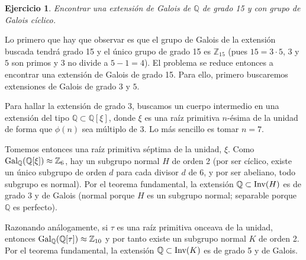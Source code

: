 \documentclass[11pt]{report}
\makeatletter
\renewenvironment{proof}[1][\proofname]{\par
  \pushQED{\qed}%
  \normalfont \topsep\z@skip %
  \trivlist
  \item[\hskip\labelsep
        \itshape
    #1\@addpunct{.}]\ignorespaces
}{%
  \popQED\endtrivlist\@endpefalse
}
\newcommand{\Z}{\mathbb Z}
\newcommand{\Q}{\mathbb Q}
\newtheorem{ejercicio}{Ejercicio}
\makeatother
\begin{document}
\begin{ejercicio}
Encontrar una extensión de Galois de $\Q$ de grado 15 y con grupo de Galois cíclico. 
\end{ejercicio}

\begin{proof}
Lo primero que hay que observar es que el grupo de Galois de la extensión buscada tendrá grado 15 y el único grupo de grado 15 es $\Z_{15}$ (pues $15 = 3 \cdot 5$, $3$ y $5$ son primos y $3$ no divide a $5-1=4$). El problema se reduce entonces a encontrar una extensión de Galois de grado 15. Para ello, primero buscaremos extensiones de Galois de grado $3$ y $5$.

Para hallar la extensión de grado $3$, buscamos un cuerpo intermedio en una extensión del tipo $\Q \subset \Q[\xi]$, donde $\xi$ es una raíz primitiva $n$-ésima de la unidad de forma que $\phi(n)$ sea múltiplo de $3$. Lo más sencillo es tomar $n = 7$. 

Tomemos entonces una raíz primitiva séptima de la unidad, $\xi$. Como $\textup{Gal}_\Q(\Q[\xi]) \approx \Z_6$, hay un subgrupo normal $H$ de orden 2 (por ser cíclico, existe un único subgrupo de orden $d$ para cada divisor $d$ de 6, y por ser abeliano, todo subgrupo es normal). Por el teorema fundamental, la extensión $\Q \subset \textup{Inv}(H)$ es de grado 3 y de Galois (normal porque $H$ es un subgrupo normal; separable porque $\Q$ es perfecto).

Razonando análogamente, si $\tau$ es una raíz primitiva onceava de la unidad, entonces $\textup{Gal}_\Q(\Q[\tau]) \approx \Z_{10}$ y por tanto existe un subgrupo normal $K$ de orden 2. Por el teorema fundamental, la extensión $\Q \subset \textup{Inv}(K)$ es de grado 5 y de Galois.


\end{proof}
\end{document}
